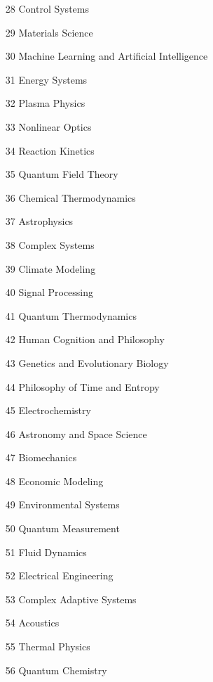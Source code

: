 \documentclass[11pt,a4paper]{article}
\begin{document}
\begin{itemize}
    \item[28] Control Systems 
    \item[29] Materials Science  %
    \item[30] Machine Learning and Artificial Intelligence 
    \item[31] Energy Systems 
    \item[32] Plasma Physics 
    \item[33] Nonlinear Optics 
    \item[34] Reaction Kinetics 
    \item[35] Quantum Field Theory  %
    \item[36] Chemical Thermodynamics 
    \item[37] Astrophysics 
    \item[38] Complex Systems 
    \item[39] Climate Modeling 
    \item[40] Signal Processing  %
    \item[41] Quantum Thermodynamics 
    \item[42] Human Cognition and Philosophy 
    \item[43] Genetics and Evolutionary Biology 
    \item[44] Philosophy of Time and Entropy 
    \item[45] Electrochemistry 
    \item[46] Astronomy and Space Science 
    \item[47] Biomechanics 
    \item[48] Economic Modeling 
    \item[49] Environmental Systems 
    \item[50] Quantum Measurement 
    \item[51] Fluid Dynamics  %
    \item[52] Electrical Engineering 
    \item[53] Complex Adaptive Systems 
    \item[54] Acoustics 
    \item[55] Thermal Physics 
    \item[56] Quantum Chemistry 

\end{itemize}
\end{document}
